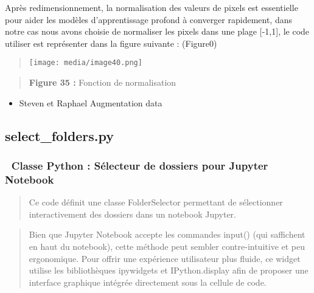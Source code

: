 Après redimensionnement, la normalisation des valeurs de pixels est
essentielle pour aider les modèles d'apprentissage profond à converger
rapidement, dans notre cas nous avons choisie de normaliser les pixels
dans une plage {[}-1,1{]}, le code utiliser est représenter dans la
figure suivante : (Figure0)

\begin{quote}
\texttt{[image: media/image40.png]}
\end{quote}

\begin{quote}
\end{quote}

\begin{quote}
\end{quote}

\begin{quote}
\textbf{Figure 35 : }Fonction de normalisation
\end{quote}

\begin{itemize}
\tightlist
\item
  \protect{}\label{anchor-53}{}Steven et Raphael
  Augmentation data
\end{itemize}

\subsection[select\_folders.py]{\texorpdfstring{\protect\hypertarget{anchor-54}{}{}select\_folders.py}{select\_folders.py}}\label{select_folders.py}

\subsubsection[📁 \textbf{Classe Python : Sélecteur de dossiers pour
Jupyter Noteboo}k]{\texorpdfstring{\protect\hypertarget{anchor-55}{}{}📁
\textbf{Classe Python : Sélecteur de dossiers pour Jupyter
Noteboo}k}{📁 Classe Python : Sélecteur de dossiers pour Jupyter Notebook}}\label{classe-python-suxe9lecteur-de-dossiers-pour-jupyter-notebook}

\begin{quote}
Ce code définit une classe FolderSelector permettant de sélectionner
interactivement des dossiers dans un notebook Jupyter.
\end{quote}

\begin{quote}
Bien que Jupyter Notebook accepte les commandes input() (qui
s\textquotesingle affichent en haut du notebook), cette méthode peut
sembler contre-intuitive et peu ergonomique. Pour offrir une expérience
utilisateur plus fluide, ce widget utilise les bibliothèques ipywidgets
et IPython.display afin de proposer une interface graphique intégrée
directement sous la cellule de code.
\end{quote}


